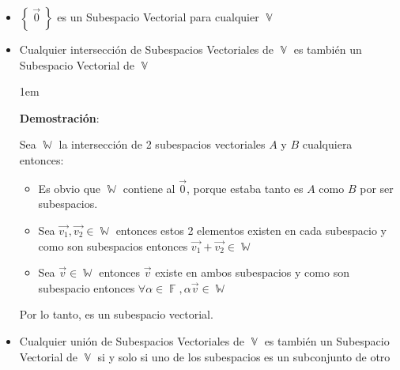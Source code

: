 \documentclass[12pt, fleqn]{report}                             %
\newenvironment{SmallIndentation}[1][0.75em]                    %
        {\begin{adjustwidth}{#1}{}\begin{footnotesize}}             %
        {\end{footnotesize}\end{adjustwidth}}                       %
\theoremstyle{break}                                            %
\DeclareMathOperator \GenericField {\mathbb{F}}                 %
\DeclareMathOperator \VectorSet    {\mathbb{V}}                 %
\DeclareMathOperator \SubVectorSet {\mathbb{W}}                 %
\newcommand{\Set}[1]            {\left\{ \; #1 \; \right\}}     %
\begin{document}
            \begin{itemize}
                
                \item 
                    $\Set{ \vec{0} }$ es un Subespacio Vectorial para cualquier $\VectorSet$

                \item
                    Cualquier intersección de Subespacios Vectoriales de $\VectorSet$ es también un
                    Subespacio Vectorial de $\VectorSet$

                    \begin{SmallIndentation}[1em]
                        \textbf{Demostración}:
                        
                        Sea $\SubVectorSet$ la intersección de 2 subespacios vectoriales $A$ y $B$ cualquiera
                        entonces:

                        \begin{itemize}
                            \item Es obvio que $\SubVectorSet$ contiene al $\vec{0}$, porque estaba tanto
                                es $A$ como $B$ por ser subespacios.

                            \item Sea $\vec{v_1}, \vec{v_2} \in \SubVectorSet$ entonces estos 2 elementos
                                existen en cada subespacio y como son subespacios entonces 
                                $\vec{v_1} + \vec{v_2} \in \SubVectorSet$

                            \item Sea $\vec{v} \in \SubVectorSet$ entonces $\vec{v}$ existe en ambos subespacios
                                y como son subespacio entonces 
                                $\forall \alpha \in \GenericField, \alpha \vec{v} \in \SubVectorSet$

                        \end{itemize}

                        Por lo tanto, es un subespacio vectorial.
                    
                    \end{SmallIndentation}

                \item
                    Cualquier unión de Subespacios Vectoriales de $\VectorSet$ es también un
                    Subespacio Vectorial de $\VectorSet$ si y solo si uno de los subespacios
                    es un subconjunto de otro                        

            \end{itemize}
\end{document}
